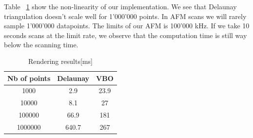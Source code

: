 Table  ~\ref{table:nonlin} show the non-linearity of our implementation. We see that Delaunay triangulation doesn't scale well for 1'000'000 points. In AFM scans we will rarely sample 1'000'000 datapoints. The limits of our AFM is 100'000 kHz. If we take 10 seconds scans at the limit rate, we observe that the computation time is still way below the scanning time. 

\begin{table}[ht]
\caption{Rendering results[ms]} %
\centering %
\begin{tabular}{c c c} %
\hline\hline %
 Nb of points & Delaunay & VBO \\ [0.5ex] %
\hline %

1000 & 2.9 & 23.9 \\
10000 & 8.1	&	27 	\\
100000 & 66.9 & 181 \\
1000000 & 640.7	& 267 \\[1ex]


\hline %
\end{tabular}
\label{table:nonlin} %
\end{table}


